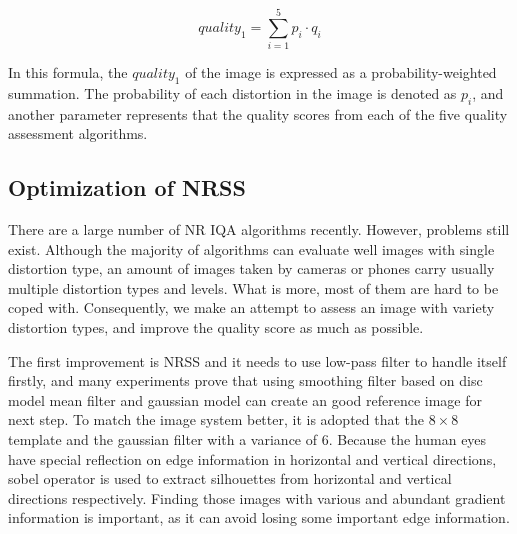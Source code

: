 \begin{equation}
quality_1 = \sum_{i=1}^{5}p_{i}\cdot q_{i}
\end{equation}

In this formula, the $quality_1$ of the image is expressed as a probability-weighted summation. The probability of each distortion in the image is denoted as $p_{i}$, and another parameter represents that the quality scores from each of the five quality assessment algorithms.



\subsection{Optimization of NRSS}

There are a large number of NR IQA algorithms recently. However, problems still exist. Although the majority of algorithms can evaluate well images with single distortion type, an amount of images taken by cameras or phones carry usually multiple distortion types and levels. What is more, most of them are hard to be coped with. Consequently, we make an attempt to assess an image with variety distortion types, and improve the quality score as much as possible.

The first improvement is NRSS and it needs to use low-pass filter to handle itself firstly, and many experiments prove that using smoothing filter based on disc model mean filter and gaussian model can create an good reference image for next step. To match the image system better, it is adopted that the $8\times8$ template and the gaussian filter with a variance of 6. Because the human eyes have special reflection on edge information in horizontal and vertical directions, sobel operator is used to extract silhouettes from horizontal and vertical directions respectively. Finding those images with various and abundant gradient information is important, as it can avoid losing some important edge information.

